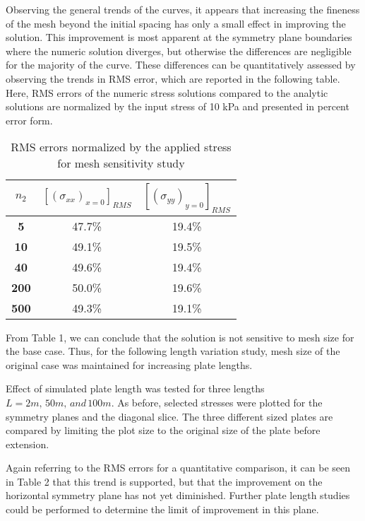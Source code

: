 \documentclass[twocolumn,10pt]{asme2ej}
\begin{document}
Observing the general trends of the curves, it appears that increasing the fineness of the mesh beyond the initial spacing has only a small effect in improving the solution.  This improvement is most apparent at the symmetry plane boundaries where the numeric solution diverges, but otherwise the differences are negligible for the majority of the curve.  These differences can be quantitatively assessed by observing the trends in RMS error, which are reported in the following table.  Here, RMS errors of the numeric stress solutions compared to the analytic solutions are normalized by the input stress of 10 kPa and presented in percent error form.


\begin{table}[h]
\begin{center}
\label{table_ASME}
\begin{tabular}{|c | c c |}
\hline
$n_2$  & \textbf{$[(\sigma_{xx})_{x=0}]_{RMS}$} & \textbf{$[(\sigma_{yy})_{y=0}]_{RMS}$}\\
\hline
\textbf{5} 		  & 47.7\% & 19.4\%\\
\textbf{10}         	  & 49.1\% & 19.5\%\\
\textbf{40} 		  & 49.6\% & 19.4\%\\
\textbf{200}		  & 50.0\% & 19.6\%\\
\textbf{500}		  & 49.3\% & 19.1\%\\
\hline
\end{tabular}
\caption{RMS errors normalized by the applied stress for mesh sensitivity study}
\end{center}
\end{table}

From Table 1, we can conclude that the solution is not sensitive to mesh size for the base case.  Thus, for the following length variation study, mesh size of the original case was maintained for increasing plate lengths.

Effect of simulated plate length was tested for three lengths $L=2m,\,50m,\,and\,100m$.  As before, selected stresses were plotted for the symmetry planes and the diagonal slice.  The three different sized plates are compared by limiting the plot size to the original size of the plate before extension.

Again referring to the RMS errors for a quantitative comparison, it can be seen in Table 2 that this trend is supported, but that the improvement on the horizontal symmetry plane has not yet diminished.  Further plate length studies could be performed to determine the limit of improvement in this plane.
\end{document}
